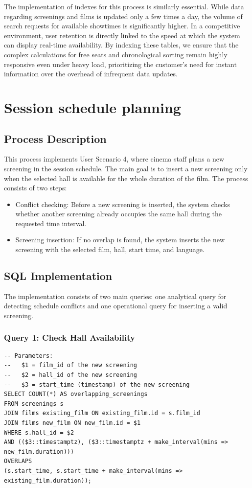 \documentclass[11pt, a4paper]{article}
\begin{document}
The implementation of indexes for this process is similarly essential.
While data regarding screenings and films is updated only a few times a day, the volume of search requests for available showtimes is significantly higher.
In a competitive environment, user retention is directly linked to the speed at which the system can display real-time availability.
By indexing these tables, we ensure that the complex calculations for free seats and chronological sorting remain highly responsive even under heavy load,
prioritizing the customer's need for instant information over the overhead of infrequent data updates.

\section{Session schedule planning}
\subsection{Process Description}

This process implements User Scenario 4, where cinema staff plans a new screening in the session schedule.
The main goal is to insert a new screening only when the selected hall is available for the whole duration of the film.
The process consists of two steps:

\begin{itemize}
    \item Conflict checking: Before a new screening is inserted, the system checks whether another screening already occupies the same hall during the requested time interval.
    \item Screening insertion: If no overlap is found, the system inserts the new screening with the selected film, hall, start time, and language.
\end{itemize}

\subsection{SQL Implementation}
The implementation consists of two main queries: one analytical query for detecting schedule conflicts and one operational query for inserting a valid screening.

\subsubsection{Query 1: Check Hall Availability}
\begin{lstlisting}
-- Parameters:
--   $1 = film_id of the new screening
--   $2 = hall_id of the new screening
--   $3 = start_time (timestamp) of the new screening
SELECT COUNT(*) AS overlapping_screenings
FROM screenings s
JOIN films existing_film ON existing_film.id = s.film_id
JOIN films new_film ON new_film.id = $1
WHERE s.hall_id = $2
AND (($3::timestamptz), ($3::timestamptz + make_interval(mins => new_film.duration)))
OVERLAPS
(s.start_time, s.start_time + make_interval(mins => existing_film.duration));
\end{lstlisting}
\end{document}
